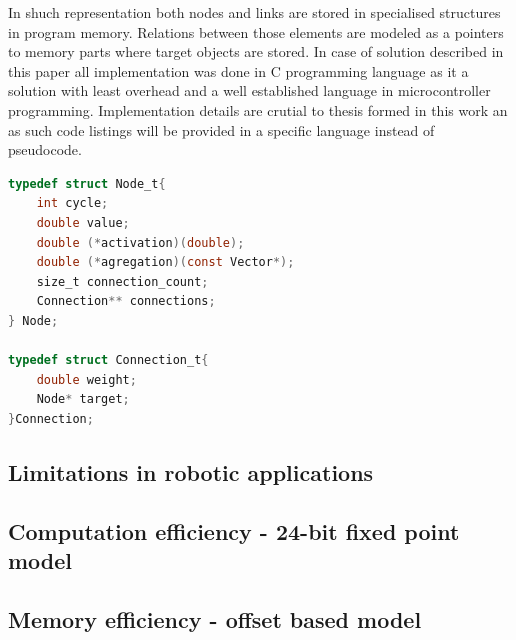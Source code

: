 In shuch representation both nodes and links are stored in specialised structures in program
memory. Relations between those elements are modeled as a pointers to memory parts where target
objects are stored.
In case of solution described in this paper all implementation was done in C programming language
as it a solution with least overhead and a well established language in microcontroller
programming. 
Implementation details are crutial to thesis formed in this work an as such code listings will be
provided in a specific language instead of pseudocode.
\begin{lstlisting}[frame=single, language=C, caption={Implementation of Node and Link structures in C}]
typedef struct Node_t{
	int cycle;
	double value;
	double (*activation)(double);
	double (*agregation)(const Vector*);
	size_t connection_count;
	Connection** connections;
} Node;

typedef struct Connection_t{
	double weight;
	Node* target;
}Connection;
\end{lstlisting}
\FloatBarrier
\subsection{Limitations in robotic applications}

\FloatBarrier
\subsection{Computation efficiency - 24-bit fixed point model}
\label{sec:fixed-model}

\FloatBarrier
\subsection{Memory efficiency - offset based model}
